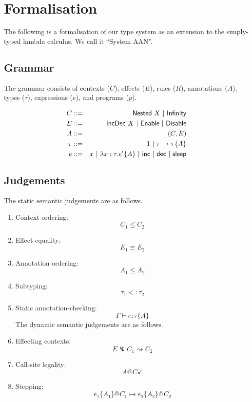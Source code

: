 \documentclass{article}
\begin{document}
\section{Formalisation}

The following is a formalisation of our type system as an extension to the simply-typed lambda calculus. We call it ``System AAN''.

\subsection{Grammar}

The grammar consists of contexts ($C$), effects ($E$), rules ($R$), annotations ($A$), types ($\tau$), expressions ($e$), and programs ($p$).

\begin{eqnarray*}
	C & ::= & {\sf Nested}~ X ~|~ {\sf Infinity} \\
	E & ::= & {\sf IncDec}~ X ~|~ {\sf Enable} ~|~ {\sf Disable} \\
	A & ::= & (C,E) \\
	\tau & ::= & 1 ~|~ \tau \rightarrow \tau \{A\} \\
	e & ::= & x ~|~ \lambda x:\tau . e' \{A\} ~|~ {\sf inc} ~|~ {\sf dec} ~|~ {\sf sleep}
\end{eqnarray*}

\subsection{Judgements}

The static semantic judgements are as follows.
\begin{enumerate}
	\item Context ordering: \[ C_1 \le C_2\]
	\item Effect equality: \[ E_1 \equiv E_2 \]
	\item Annotation ordering: \[ A_1 \le A_2 \]
	\item Subtyping: \[ \tau_1 <: \tau_2 \]
	\item Static annotation-checking: \[ \Gamma \vdash e : \tau \{A\} \]
The dynamic semantic judgements are as follows.
	\item Effecting contexts: \[ E \lightning C_1 \rightsquigarrow C_2 \]
	\item Call-site legality: \[ A @ C \checkmark \]
	\item Stepping: \[ e_1\{A_1\}@C_1 \mapsto e_2\{A_2\}@C_2 \]
\end{enumerate}
\end{document}
